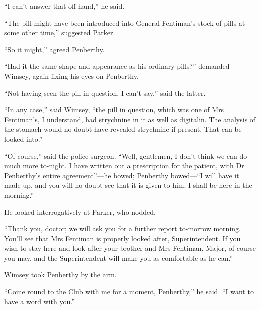 \enquote{I can't answer that off-hand,} he said.

\enquote{The pill might have been introduced into General Fentiman's stock of pills at some other time,} suggested Parker.

\enquote{So it might,} agreed Penberthy.

\enquote{Had it the same shape and appearance as his ordinary pills?} demanded Wimsey, again fixing his eyes on Penberthy.

\enquote{Not having seen the pill in question, I can't say,} said the latter.

\enquote{In any case,} said Wimsey, \enquote{the pill in question, which was one of Mrs Fentiman's, I understand, had strychnine in it as well as digitalin. The analysis of the stomach would no doubt have revealed strychnine if present. That can be looked into.}

\enquote{Of course,} said the police-surgeon. \enquote{Well, gentlemen, I don't think we can do much more to-night. I have written out a prescription for the patient, with Dr Penberthy's entire agreement}---he bowed; Penberthy bowed---\enquote{I will have it made up, and you will no doubt see that it is given to him. I shall be here in the morning.}

He looked interrogatively at Parker, who nodded.

\enquote{Thank you, doctor; we will ask you for a further report to-morrow morning. You'll see that Mrs Fentiman is properly looked after, Superintendent. If you wish to stay here and look after your brother and Mrs Fentiman, Major, of course you may, and the Superintendent will make you as comfortable as he can.}

Wimsey took Penberthy by the arm.

\enquote{Come round to the Club with me for a moment, Penberthy,} he said. \enquote{I want to have a word with you.}